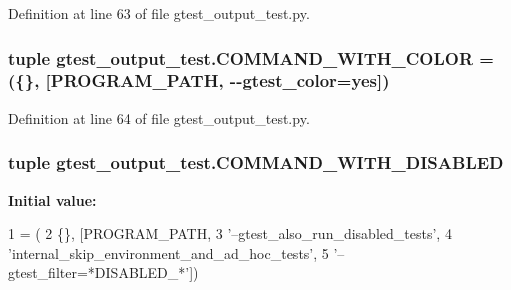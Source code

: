 Definition at line 63 of file gtest\+\_\+output\+\_\+test.\+py.

\subsubsection[{\texorpdfstring{C\+O\+M\+M\+A\+N\+D\+\_\+\+W\+I\+T\+H\+\_\+\+C\+O\+L\+OR}{COMMAND_WITH_COLOR}}]{\setlength{\rightskip}{0pt plus 5cm}tuple gtest\+\_\+output\+\_\+test.\+C\+O\+M\+M\+A\+N\+D\+\_\+\+W\+I\+T\+H\+\_\+\+C\+O\+L\+OR = (\{\}, \mbox{[}{\bf P\+R\+O\+G\+R\+A\+M\+\_\+\+P\+A\+TH}, \textquotesingle{}-\/-\/gtest\+\_\+color=yes\textquotesingle{}\mbox{]})}\hypertarget{namespacegtest__output__test_adbeb34904b377333d8168d1b54584b53}{}\label{namespacegtest__output__test_adbeb34904b377333d8168d1b54584b53}


Definition at line 64 of file gtest\+\_\+output\+\_\+test.\+py.

\subsubsection[{\texorpdfstring{C\+O\+M\+M\+A\+N\+D\+\_\+\+W\+I\+T\+H\+\_\+\+D\+I\+S\+A\+B\+L\+ED}{COMMAND_WITH_DISABLED}}]{\setlength{\rightskip}{0pt plus 5cm}tuple gtest\+\_\+output\+\_\+test.\+C\+O\+M\+M\+A\+N\+D\+\_\+\+W\+I\+T\+H\+\_\+\+D\+I\+S\+A\+B\+L\+ED}\hypertarget{namespacegtest__output__test_a0ef963a39dc8e53616ba2dab9f128def}{}\label{namespacegtest__output__test_a0ef963a39dc8e53616ba2dab9f128def}
{\bfseries Initial value\+:}
\begin{DoxyCode}
1 = (
2     \{\}, [PROGRAM\_PATH,
3          \textcolor{stringliteral}{'--gtest\_also\_run\_disabled\_tests'},
4          \textcolor{stringliteral}{'internal\_skip\_environment\_and\_ad\_hoc\_tests'},
5          \textcolor{stringliteral}{'--gtest\_filter=*DISABLED\_*'}])
\end{DoxyCode}


